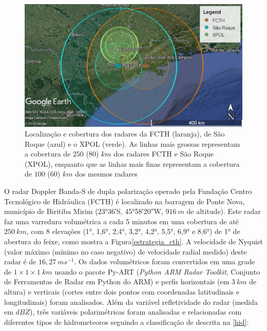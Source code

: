 \begin{figure}[htb]
	\begin{center}
		\caption{Localização e cobertura dos radares da FCTH (laranja), de São Roque (azul) e o XPOL (verde). As linhas mais grossas representam a cobertura de $250$ ($80$) $km$ dos radares FCTH e São Roque (XPOL), enquanto que as linhas mais finas representam a cobertura de $100$ ($60$) $km$ dos mesmos radares} 
		\label{cobertura_radares}
		\includegraphics[width=\columnwidth]{figs/radar_coverages_hires2.jpg}
	\end{center}
\end{figure}

O radar Doppler Banda-S de dupla polarização operado pela Fundação Centro Tecnológico de Hidráulica (FCTH) é localizado na barragem de Ponte Nova, município de Biritiba Mirim (\ang{23;36;}\:S, \ang{45;58;20}\:W, $916\:m$ de altitude). Este radar faz uma varredura volumétrica a cada 5 minutos em uma cobertura de até $250\:km$, com 8 elevações (\ang{1}, \ang{1,6}, \ang{2,4}, \ang{3,2}, \ang{4,2}, \ang{5,5}, \ang{6,9} e \ang{8,6}) de \ang{1} de abertura do feixe, como mostra a Figura\autoref{estrategia_cth}. A velocidade de Nyquist (valor máximo (mínimo no caso negativo) de velocidade radial medido) deste radar é de $16,27\:ms^{-1}$. Os dados volumétricos foram convertidos em uma grade de $1 \times 1 \times 1\:km$ usando o pacote Py-ART (\textit{Python ARM Radar Toolkit}, Conjunto de Ferramentas de Radar em Python do ARM) \cite{Helmus2016} e perfis horizontais (em $3\:km$ de altura) e verticais (cortes entre dois pontos com coordenadas latitudinais e longitudinais) foram analisados. Além da variável refletividade do radar (medida em $dBZ$), três variáveis polarimétricas foram analisadas e relacionadas com diferentes tipos de hidrometeoros seguindo a classificação de  descrita na \autoref{hid}:

